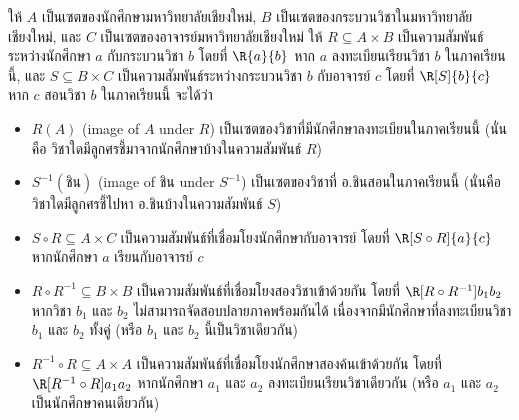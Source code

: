 \begin{example}
ให้ $A$ เป็นเซตของนักศึกษามหาวิทยาลัยเชียงใหม่, $B$ เป็นเซตของกระบวนวิชาในมหาวิทยาลัยเชียงใหม่, และ $C$ เป็นเซตของอาจารย์มหาวิทยาลัยเชียงใหม่ \enskip ให้ $R\subseteq A\times B$ เป็นความสัมพันธ์ระหว่างนักศึกษา $a$ กับกระบวนวิชา $b$ โดยที่ $\R{a}{b}$ หาก $a$ ลงทะเบียนเรียนวิชา $b$ ในภาคเรียนนี้, และ $S\subseteq B\times C$ เป็นความสัมพันธ์ระหว่างกระบวนวิชา $b$ กับอาจารย์ $c$ โดยที่ $\R[S]{b}{c}$ หาก $c$ สอนวิชา $b$ ในภาคเรียนนี้ \enskip จะได้ว่า
\begin{itemize}[]
\item $R(A)$ (image of $A$ under $R$) เป็นเซตของวิชาที่มีนักศึกษาลงทะเบียนในภาคเรียนนี้ (นั่นคือ วิชาใดมีลูกศรชี้มาจากนักศึกษาบ้างในความสัมพันธ์ $R$)
\item $S^{-1}(\textrm{ชิน})$ (image of ชิน under $S^{-1}$) เป็นเซตของวิชาที่ อ.ชินสอนในภาคเรียนนี้ (นั่นคือ วิชาใดมีลูกศรชี้ไปหา อ.ชินบ้างในความสัมพันธ์ $S$)
\item $S\circ R\subseteq A\times C$ เป็นความสัมพันธ์ที่เชื่อมโยงนักศึกษากับอาจารย์ โดยที่ $\R[S\circ R]{a}{c}$ หากนักศึกษา $a$ เรียนกับอาจารย์ $c$
\item $R\circ R^{-1}\subseteq B\times B$ เป็นความสัมพันธ์ที่เชื่อมโยงสองวิชาเข้าด้วยกัน โดยที่ $\R[R\circ R^{-1}]{b_1}{b_2}$ หากวิชา $b_1$ และ $b_2$ ไม่สามารถจัดสอบปลายภาคพร้อมกันได้ เนื่องจากมีนักศึกษาที่ลงทะเบียนวิชา $b_1$ และ $b_2$ ทั้งคู่ (หรือ $b_1$ และ $b_2$ นี้เป็นวิชาเดียวกัน)
\item $R^{-1}\circ R\subseteq A\times A$ เป็นความสัมพันธ์ที่เชื่อมโยงนักศึกษาสองค้นเข้าด้วยกัน โดยที่ $\R[R^{-1}\circ R]{a_1}{a_2}$ หากนักศึกษา $a_1$ และ $a_2$ ลงทะเบียนเรียนวิชาเดียวกัน (หรือ $a_1$ และ $a_2$ เป็นนักศึกษาคนเดียวกัน)
\end{itemize}
\end{example}
